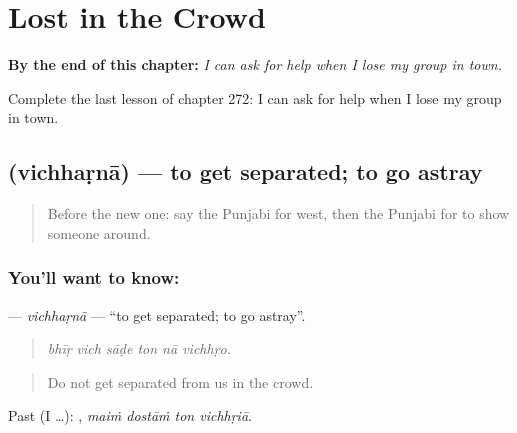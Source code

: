 
\chapter{Lost in the Crowd}
\label{ch:pa-a2-lost-in-the-crowd}

\begin{chapteropening}
\textbf{By the end of this chapter:} \emph{I can ask for help when I lose my group in town.}

Complete the last lesson of chapter 272: I can ask for help when I lose my group in town.
\end{chapteropening}

\section[\texorpdfstring{\pa{ਵਿਛੜਨਾ} (vichhaṛnā)}{ਵਿਛੜਨਾ (vichhaṛnā)}]{ (vichhaṛnā) — to get separated; to go astray}

\label{lesson:PA-C272-vichharna}



\begin{quote}
Before the new one: say the Punjabi for west, then the Punjabi for to show someone around.
\end{quote}

\subsection*{You'll want to know: }
\textbf{} — \emph{vichhaṛnā} — \textquotedblleft{}to get separated; to go astray\textquotedblright{}.

\begin{quote}
     
\end{quote}

\begin{quote}
\emph{bhīṛ vich sāḍe ton nā vichhṛo.}
\end{quote}

\begin{quote}
Do not get separated from us in the crowd.
\end{quote}

Past (I …):    , \emph{maiṁ dostāṁ ton vichhṛiā}.

